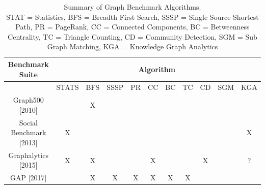 \documentclass[letterpaper, 10pt]{article}
\begin{document}
\begin{multicols}{2}
        \scriptsize
        \begin{table}[h]
        \centering
          \begin{tabular}{ |c|c|c|c|c|c|c|c|c|c|c|}
            \hline
            {Benchmark Suite} & \multicolumn{10}{|c|}{Algorithm}\\
            \hline
                                                      & STATS & BFS & SSSP & PR & CC & BC & TC & CD & SGM & KGA \\
            \hline
             Graph500 [2010]\cite{Murphy2010}         &       & X   &      &    &    &    &    &    &     &      \\
             Social Benchmark [2013]\cite{Angles2013} &   X   &     &      &    &    &    &    &    &     &  X   \\
             Graphalytics [2015]\cite{Capota2015}     &   X   & X   &      &    & X  &    &    &  X &     & ?    \\
             GAP [2017]\cite{Beamer2017}              &       & X   & X    & X  & X  & X  & X  &    &     &      \\
            \hline
          \end{tabular}
          \caption{Summary of Graph Benchmark Algorithms.\\ STAT = Statistics, BFS = Breadth First Search, SSSP = Single Source Shortest Path, PR = PageRank, CC = Connected Components, BC = Betweenness Centrality, TC = Triangle Counting, CD = Community Detection, SGM = Sub Graph Matching, KGA = Knowledge Graph Analytics}
          \label{table:graphAlgorithms}
        \end{table}

        \normalsize


\end{multicols}
\end{document}
